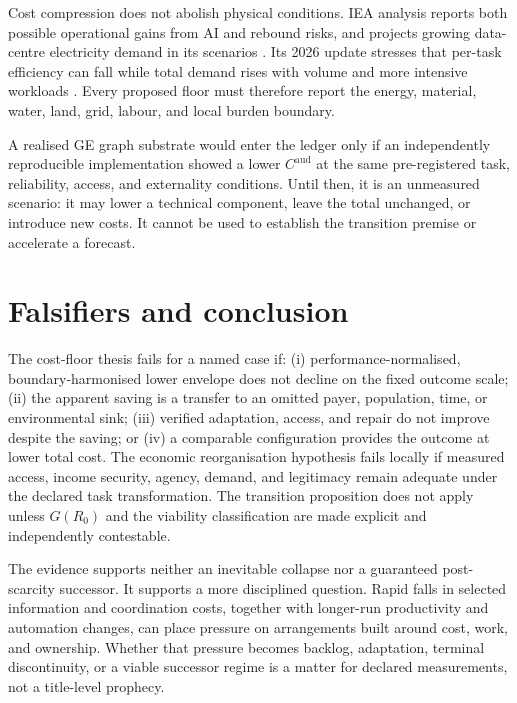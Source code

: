 \documentclass[11pt]{article}
\begin{document}
Cost compression does not abolish physical conditions. IEA analysis reports
both possible operational gains from AI and rebound risks, and projects growing
data-centre electricity demand in its scenarios \citep{iea2025}. Its 2026
update stresses that per-task efficiency can fall while total demand rises with
volume and more intensive workloads \citep{iea2026}. Every proposed floor must
therefore report the energy, material, water, land, grid, labour, and local
burden boundary.

A realised GE graph substrate would enter the ledger only if an independently
reproducible implementation showed a lower $C^{\mathrm{aud}}$ at the same
pre-registered task, reliability, access, and externality conditions. Until
then, it is an unmeasured scenario: it may lower a technical component, leave
the total unchanged, or introduce new costs. It cannot be used to establish the
transition premise or accelerate a forecast.

\section{Falsifiers and conclusion}\label{sec:falsifiers}

The cost-floor thesis fails for a named case if: (i) performance-normalised,
boundary-harmonised lower envelope does not decline on the fixed outcome scale; (ii) the apparent saving is a transfer to an omitted payer, population,
time, or environmental sink; (iii) verified adaptation, access, and repair do
not improve despite the saving; or (iv) a comparable configuration provides the
outcome at lower total cost. The economic reorganisation hypothesis fails
locally if measured access, income security, agency, demand, and legitimacy
remain adequate under the declared task transformation. The transition
proposition does not apply unless $G(R_0)$ and the viability classification are
made explicit and independently contestable.

The evidence supports neither an inevitable collapse nor a guaranteed
post-scarcity successor. It supports a more disciplined question. Rapid falls
in selected information and coordination costs, together with longer-run
productivity and automation changes, can place pressure on arrangements built
around cost, work, and ownership. Whether that pressure becomes backlog,
adaptation, terminal discontinuity, or a viable successor regime is a matter
for declared measurements, not a title-level prophecy.
\end{document}
